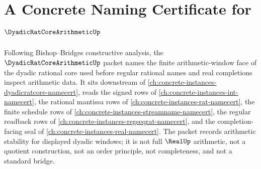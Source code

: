 \chapter{A Concrete Naming Certificate for $\DyadicRatCoreArithmeticUp$}
\label{ch:concrete-instances-dyadic-rat-core-arithmetic-namecert}

Following Bishop--Bridges constructive analysis, the $\DyadicRatCoreArithmeticUp$ packet names the finite arithmetic-window face of the dyadic rational core used before regular rational names and real completions inspect arithmetic data. It sits downstream of \autoref{ch:concrete-instances-dyadicratcore-namecert}, reads the signed rows of \autoref{ch:concrete-instances-int-namecert}, the rational mantissa rows of \autoref{ch:concrete-instances-rat-namecert}, the finite schedule rows of \autoref{ch:concrete-instances-streamname-namecert}, the regular readback rows of \autoref{ch:concrete-instances-regseqrat-namecert}, and the completion-facing seal of \autoref{ch:concrete-instances-real-namecert}. The packet records arithmetic stability for displayed dyadic windows; it is not full $\RealUp$ arithmetic, not a quotient construction, not an order principle, not completeness, and not a standard bridge.

